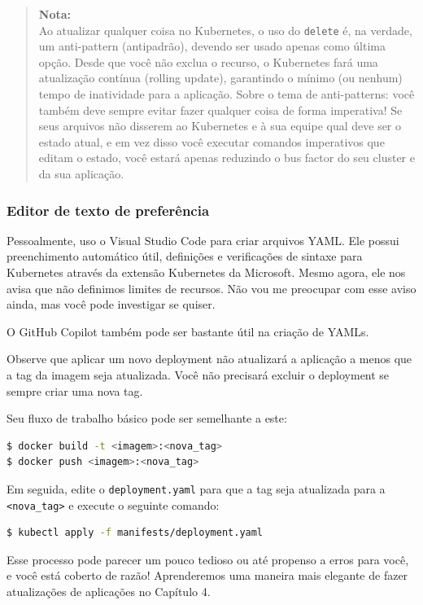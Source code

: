 \documentclass[12pt,a4paper]{article}
\begin{document}
\begin{quote}
\textbf{Nota:} \\
Ao atualizar qualquer coisa no Kubernetes, o uso do \texttt{delete} é, na verdade, um anti-pattern (antipadrão), devendo ser usado apenas como última opção. Desde que você não exclua o recurso, o Kubernetes fará uma atualização contínua (rolling update), garantindo o mínimo (ou nenhum) tempo de inatividade para a aplicação. Sobre o tema de anti-patterns: você também deve sempre evitar fazer qualquer coisa de forma imperativa! Se seus arquivos não disserem ao Kubernetes e à sua equipe qual deve ser o estado atual, e em vez disso você executar comandos imperativos que editam o estado, você estará apenas reduzindo o bus factor do seu cluster e da sua aplicação.
\end{quote}

\subsubsection{Editor de texto de preferência}
\label{sec:editor}

Pessoalmente, uso o Visual Studio Code para criar arquivos YAML. Ele possui preenchimento automático útil, definições e verificações de sintaxe para Kubernetes através da extensão Kubernetes da Microsoft. Mesmo agora, ele nos avisa que não definimos limites de recursos. Não vou me preocupar com esse aviso ainda, mas você pode investigar se quiser.

O GitHub Copilot também pode ser bastante útil na criação de YAMLs.

Observe que aplicar um novo deployment não atualizará a aplicação a menos que a tag da imagem seja atualizada. Você não precisará excluir o deployment se sempre criar uma nova tag.

Seu fluxo de trabalho básico pode ser semelhante a este:

\begin{lstlisting}[language=bash]
$ docker build -t <imagem>:<nova_tag>
$ docker push <imagem>:<nova_tag>
\end{lstlisting}

Em seguida, edite o \texttt{deployment.yaml} para que a tag seja atualizada para a \texttt{<nova\_tag>} e execute o seguinte comando:

\begin{lstlisting}[language=bash]
$ kubectl apply -f manifests/deployment.yaml
\end{lstlisting}

Esse processo pode parecer um pouco tedioso ou até propenso a erros para você, e você está coberto de razão! Aprenderemos uma maneira mais elegante de fazer atualizações de aplicações no Capítulo 4.
\end{document}
